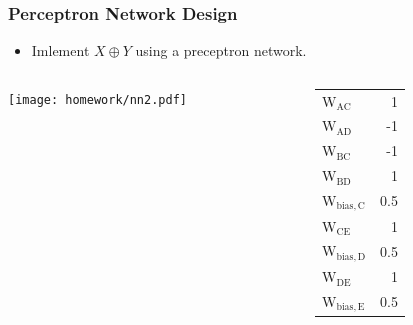 \documentclass[compress, 9pt]{beamer}
\begin{document}
\begin{frame}
\frametitle{Perceptron Network Design}
\label{sec-1-3}
\begin{itemize}

\item <1-> Imlement $X \oplus Y$ using a preceptron network.
\label{sec-1-3-1}%
\end{itemize} %
\begin{columns}
\begin{column}{0.3\textwidth}
\label{sec-1-3-2}

\texttt{[image: homework/nn2.pdf]}
\end{column}
\begin{column}{0.5\textwidth}
\label{sec-1-3-3}


\begin{center}
\begin{tabular}{lr}
\hline
 W$_{\mathrm{AC}}$      &    1  \\
 W$_{\mathrm{AD}}$      &   -1  \\
 W$_{\mathrm{BC}}$      &   -1  \\
 W$_{\mathrm{BD}}$      &    1  \\
 W$_{\mathrm{bias,C}}$  &  0.5  \\
 W$_{\mathrm{CE}}$      &    1  \\
 W$_{\mathrm{bias,D}}$  &  0.5  \\
 W$_{\mathrm{DE}}$      &    1  \\
 W$_{\mathrm{bias,E}}$  &  0.5  \\
\hline
\end{tabular}
\end{center}
\end{column}
\end{columns}
\end{frame}
\end{document}
